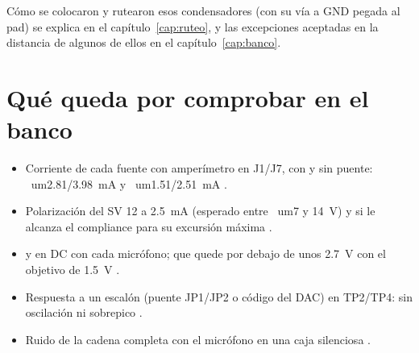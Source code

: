 Cómo se colocaron y rutearon esos condensadores (con su vía a GND pegada al pad) se explica en el
capítulo~\ref{cap:ruteo}, y las excepciones aceptadas en la distancia de algunos de ellos en el
capítulo~\ref{cap:banco}.

\section{Qué queda por comprobar en el banco}\label{sec:c03-banco}

\begin{itemize}
  \item Corriente de cada fuente con amperímetro en J1/J7, con y sin puente: \
um{2.81}/\SI{3.98}{\milli\ampere} y
        \
um{1.51}/\SI{2.51}{\milli\ampere} \medir.
  \item Polarización del SV 12 a \SI{2.5}{\milli\ampere} (esperado entre \
um{7} y \SI{14}{\volt}) y si le alcanza el
        compliance para su excursión máxima \medir.
  \item {} y \net{REST_OUT} en DC con cada micrófono; que \net{VSHIFT} quede por debajo de unos \SI{2.7}{\volt}
        con el objetivo de \SI{1.5}{\volt} \medir.
  \item Respuesta a un escalón (puente JP1/JP2 o código del DAC) en TP2/TP4: sin oscilación ni sobrepico \medir.
  \item Ruido de la cadena completa con el micrófono en una caja silenciosa \medir.
\end{itemize}

